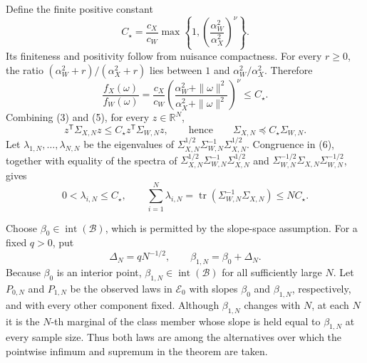 Define the finite positive constant
\[
 C_\star=\frac{c_X}{c_W}
 \max\left\{1,\left(\frac{\alpha_W^2}{\alpha_X^2}\right)^\nu\right\}.
 \tag{4}
\]
Its finiteness and positivity follow from nuisance compactness.  For every \(r\geq0\), the ratio \((\alpha_W^2+r)/(\alpha_X^2+r)\) lies between \(1\) and \(\alpha_W^2/\alpha_X^2\).  Therefore
\[
 \frac{f_X(\omega)}{f_W(\omega)}
 =\frac{c_X}{c_W}
 \left(\frac{\alpha_W^2+\|\omega\|^2}
 {\alpha_X^2+\|\omega\|^2}\right)^\nu
 \leq C_\star.
 \tag{5}
\]
Combining (3) and (5), for every \(z\in\mathbb R^N\),
\[
 z^{\mathsf T}\Sigma_{X,N}z
 \leq C_\star z^{\mathsf T}\Sigma_{W,N}z,
 \qquad\text{hence}\qquad
 \Sigma_{X,N}\preceq C_\star\Sigma_{W,N}.
 \tag{6}
\]
Let \(\lambda_{1,N},\ldots,\lambda_{N,N}\) be the eigenvalues of \(\Sigma_{X,N}^{1/2}\Sigma_{W,N}^{-1}\Sigma_{X,N}^{1/2}\).  Congruence in (6), together with equality of the spectra of \(\Sigma_{X,N}^{1/2}\Sigma_{W,N}^{-1}\Sigma_{X,N}^{1/2}\) and \(\Sigma_{W,N}^{-1/2}\Sigma_{X,N}\Sigma_{W,N}^{-1/2}\), gives
\[
 0<\lambda_{i,N}\leq C_\star,
 \qquad
 \sum_{i=1}^N\lambda_{i,N}
 =\operatorname{tr}(\Sigma_{W,N}^{-1}\Sigma_{X,N})
 \leq NC_\star.
 \tag{7}
\]

Choose \(\beta_0\in\operatorname{int}(\mathcal B)\), which is permitted by the slope-space assumption.  For a fixed \(q>0\), put
\[
 \Delta_N=qN^{-1/2},
 \qquad
 \beta_{1,N}=\beta_0+\Delta_N.
 \tag{8}
\]
Because \(\beta_0\) is an interior point, \(\beta_{1,N}\in\operatorname{int}(\mathcal B)\) for all sufficiently large \(N\).  Let \(P_{0,N}\) and \(P_{1,N}\) be the observed laws in \(\mathcal E_0\) with slopes \(\beta_0\) and \(\beta_{1,N}\), respectively, and with every other component fixed.  Although \(\beta_{1,N}\) changes with \(N\), at each \(N\) it is the \(N\)-th marginal of the class member whose slope is held equal to \(\beta_{1,N}\) at every sample size.  Thus both laws are among the alternatives over which the pointwise infimum and supremum in the theorem are taken.

